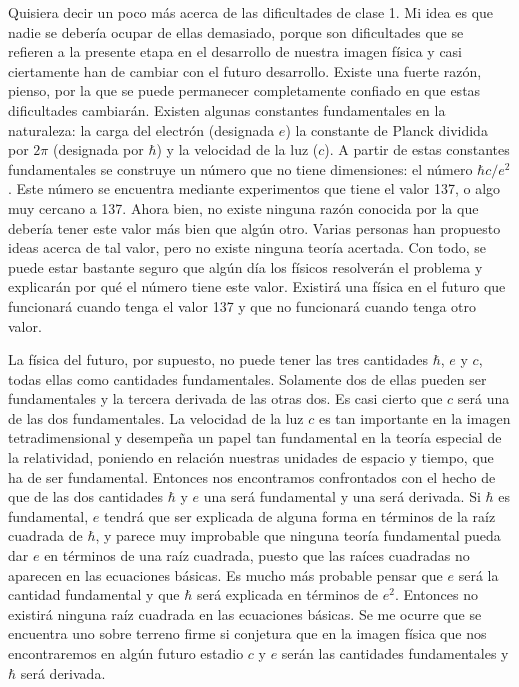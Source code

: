 \documentclass[a4paper, 12pt]{article}
\begin{document}
Quisiera decir un poco más acerca de las dificultades de clase 1. Mi idea es que nadie se debería ocupar de ellas demasiado, porque son dificultades que se refieren a la presente etapa en el desarrollo de nuestra imagen física y casi ciertamente han de cambiar con el futuro desarrollo. Existe una fuerte razón, pienso, por la que se puede permanecer completamente confiado en que estas dificultades cambiarán. Existen algunas constantes fundamentales en la naturaleza: la carga del electrón (designada $e$) la constante de Planck dividida por $2\pi$ (designada por $\hbar$) y la velocidad de la luz ($c$). A partir de estas constantes fundamentales se construye un número que no tiene dimensiones: el número $\hbar c/e^2$. Este número se encuentra mediante experimentos que tiene el valor 137, o algo muy cercano a 137. Ahora bien, no existe ninguna razón conocida por la que debería tener este valor más bien que algún otro. Varias personas han propuesto ideas acerca de tal valor, pero no existe ninguna teoría acertada. Con todo, se puede estar bastante seguro que algún día los físicos resolverán el problema y explicarán por qué el número tiene este valor. Existirá una física en el futuro que funcionará cuando tenga el valor 137 y que no funcionará cuando tenga otro valor.

La física del futuro, por supuesto, no puede tener las tres cantidades $\hbar$, $e$ y $c$, todas ellas como cantidades fundamentales. Solamente dos de ellas pueden ser fundamentales y la tercera derivada de las otras dos. Es casi cierto que $c$ será una de las dos fundamentales. La velocidad de la luz $c$ es tan importante en la imagen tetradimensional y desempeña un papel tan fundamental en la teoría especial de la relatividad, poniendo en relación nuestras unidades de espacio y tiempo, que ha de ser fundamental. Entonces nos encontramos confrontados con el hecho de que de las dos cantidades $\hbar$ y $e$ una será fundamental y una será derivada. Si $\hbar$ es fundamental, $e$ tendrá que ser explicada de alguna forma en términos de la raíz cuadrada de $\hbar$, y parece muy improbable que ninguna teoría fundamental pueda dar $e$ en términos de una raíz cuadrada, puesto que las raíces cuadradas no aparecen en las ecuaciones básicas. Es mucho más probable pensar que $e$ será la cantidad fundamental y que $\hbar$ será explicada en términos de $e^2$. Entonces no existirá ninguna raíz cuadrada en las ecuaciones básicas. Se me ocurre que se encuentra uno sobre terreno firme si conjetura que en la imagen física que nos encontraremos en algún futuro estadio $c$ y $e$ serán las cantidades fundamentales y $\hbar$ será derivada.
\end{document}
